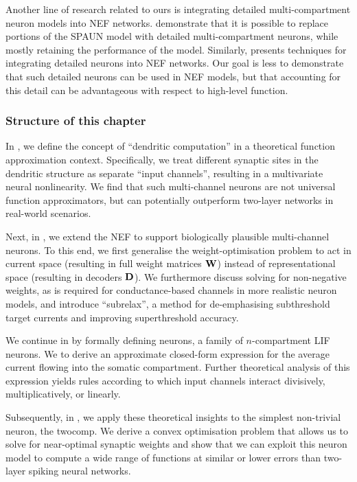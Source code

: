 Another line of research related to ours is integrating detailed multi-compartment neuron models into NEF networks.
 demonstrate that it is possible to replace portions of the SPAUN model \citep{eliasmith2012largescale} with detailed multi-compartment neurons, while mostly retaining the performance of the model. Similarly, \citet{duggins2017incorporating} presents techniques for integrating detailed neurons into NEF networks.
Our goal is less to demonstrate that such detailed neurons can be used in NEF models, but that accounting for this detail can be advantageous with respect to high-level function.

\subsubsection{Structure of this chapter}
In , we define the concept of \enquote{dendritic computation} in a theoretical function approximation context.
Specifically, we treat different synaptic sites in the dendritic structure as separate \enquote{input channels}, resulting in a multivariate neural nonlinearity.
We find that such multi-channel neurons are not universal function approximators, but can potentially outperform two-layer networks in real-world scenarios.

Next, in , we extend the NEF to support biologically plausible multi-channel neurons.
To this end, we first generalise the weight-optimisation problem to act in current space (resulting in full weight matrices $\mathbf{W}$) instead of representational space (resulting in decoders $\mathbf{D}$).
We furthermore discuss solving for non-negative weights, as is required for conductance-based channels in more realistic neuron models, and introduce \enquote{\gls{subrelax}}, a method for de-emphasising subthreshold target currents and improving superthreshold accuracy.

We continue in  by formally defining \nlif neurons, a family of $n$-compartment LIF neurons.
We to derive an approximate closed-form expression for the average current flowing into the somatic compartment.
Further theoretical analysis of this expression yields rules according to which input channels interact divisively, multiplicatively, or linearly.

Subsequently, in , we apply these theoretical insights to the simplest non-trivial \nlif neuron, the \gls{twocomp}.
We derive a convex optimisation problem that allows us to solve for near-optimal synaptic weights and show that we can exploit this neuron model to compute a wide range of functions at similar or lower errors than two-layer spiking neural networks.

